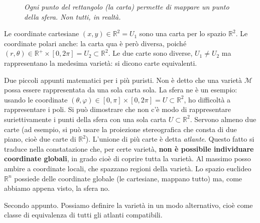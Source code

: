 \documentclass[a4paper,openany]{article}
\begin{document}
	\begin{figure}
		\centering
		\caption{\textit{Ogni punto del rettangolo (la carta) permette di mappare un punto della sfera. Non tutti, in realtà.}}
	\end{figure}
	Le coordinate cartesiane $(x,y) \in \mathbb{R}^{2} = U_1$ sono una carta per lo spazio $\mathbb{R}^2$. Le coordinate polari anche: la carta qua è però diversa, poiché $(r,\theta) \in\mathbb{R}^+ \times [0,2\pi] = U_2 \subset \mathbb{R}^2$. Le due carte sono diverse, $U_1 \neq U_2$ ma rappresentano la medesima varietà: si dicono carte equivalenti.
	\begin{tcolorbox}
		Due piccoli appunti matematici per i più puristi. Non è detto che una varietà $\mathcal{M}$ possa essere rappresentata da una sola carta sola. La sfera ne è un esempio: usando le coordinate $(\theta,\varphi)\in[0,\pi]\times[0,2\pi] = U\subset\mathbb{R}^2$, ho difficoltà a rappresentare i poli. Si può dimostrare che non c'è modo di rappresentare suriettivamente i punti della sfera con una sola carta $U\subset\mathbb{R}^2$. Servono almeno due carte (ad esempio, si può usare la proiezione stereografica che consta di due piano, cioè due carte di $\mathbb{R}^2$). L'unione di più carte è detta \textit{atlante}. Questo fatto si traduce nella constatazione che, per certe varietà, \textbf{non è possibile individuare coordinate globali}, in grado cioè di coprire tutta la varietà. Al massimo posso ambire a coordinate locali, che spazzano regioni della varietà. Lo spazio euclideo $\mathbb{R}^n$ possiede delle coordinate globale (le cartesiane, mappano tutto) ma, come abbiamo appena visto, la sfera no.
		
		Secondo appunto. Possiamo definire la varietà in un modo alternativo, cioè come classe di equivalenza di tutti gli atlanti compatibili.
	\end{tcolorbox}
	
\end{document}
